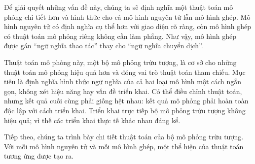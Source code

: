 Để giải quyết những vấn đề này, chúng ta sẽ định nghĩa một thuật toán mô phỏng chi tiết hơn và hình thức cho cả mô hình nguyên tử lẫn mô hình ghép. Mô hình nguyên tử có định nghĩa cụ thể hơn với giao diện rõ ràng, còn mô hình ghép có thuật toán mô phỏng riêng không cần làm phẳng. Như vậy, mô hình ghép được gán ``ngữ nghĩa thao tác'' thay cho ``ngữ nghĩa chuyển dịch''.

Thuật toán mô phỏng này, một bộ mô phỏng trừu tượng, là cơ sở cho những thuật toán mô phỏng hiệu quả hơn và đóng vai trò thuật toán tham chiếu. Mục tiêu là định nghĩa hình thức ngữ nghĩa của cả hai loại mô hình một cách ngắn gọn, không xét hiệu năng hay vấn đề triển khai. Có thể điều chỉnh thuật toán, nhưng kết quả cuối cùng phải giống hệt nhau: kết quả mô phỏng phải hoàn toàn độc lập với cách triển khai. Triển khai trực tiếp bộ mô phỏng trừu tượng không hiệu quả; vì thế các triển khai thực tế khác nhau đáng kể.

Tiếp theo, chúng ta trình bày chi tiết thuật toán của bộ mô phỏng trừu tượng. Với mỗi mô hình nguyên tử và mỗi mô hình ghép, một thể hiện của thuật toán tương ứng được tạo ra.

